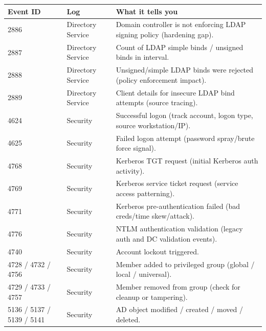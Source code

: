 \documentclass[10pt]{article}
\begin{document}
\begin{tcolorbox}[title=Important Event IDs (LDAP / AD Services)]
\footnotesize
\begin{tabular}{|p{0.6in}|p{1.2in}|p{4.9in}|}
\hline
\textbf{Event ID} & \textbf{Log} & \textbf{What it tells you} \\ \hline
2886 & Directory Service & Domain controller is not enforcing LDAP signing policy (hardening gap). \\ \hline
2887 & Directory Service & Count of LDAP simple binds / unsigned binds in interval. \\ \hline
2888 & Directory Service & Unsigned/simple LDAP binds were rejected (policy enforcement impact). \\ \hline
2889 & Directory Service & Client details for insecure LDAP bind attempts (source tracing). \\ \hline
4624 & Security & Successful logon (track account, logon type, source workstation/IP). \\ \hline
4625 & Security & Failed logon attempt (password spray/brute force signal). \\ \hline
4768 & Security & Kerberos TGT request (initial Kerberos auth activity). \\ \hline
4769 & Security & Kerberos service ticket request (service access patterning). \\ \hline
4771 & Security & Kerberos pre-authentication failed (bad creds/time skew/attack). \\ \hline
4776 & Security & NTLM authentication validation (legacy auth and DC validation events). \\ \hline
4740 & Security & Account lockout triggered. \\ \hline
4728 / 4732 / 4756 & Security & Member added to privileged group (global / local / universal). \\ \hline
4729 / 4733 / 4757 & Security & Member removed from group (check for cleanup or tampering). \\ \hline
5136 / 5137 / 5139 / 5141 & Security & AD object modified / created / moved / deleted. \\ \hline
\end{tabular}
\normalsize
\end{tcolorbox}
\end{document}
